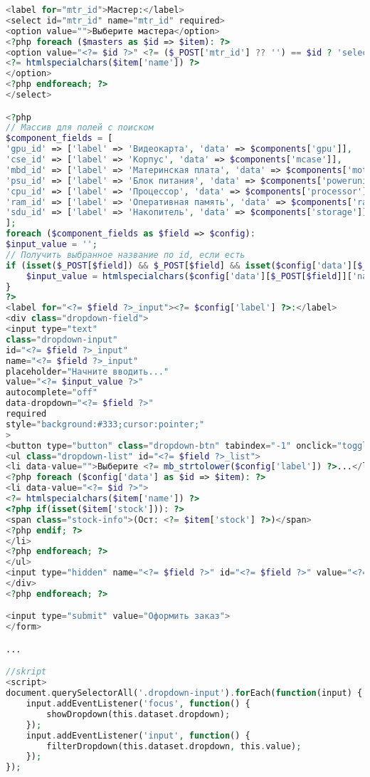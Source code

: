 \begin{lstlisting}[language=Php, frame=none]
<label for="mtr_id">Мастер:</label>
<select id="mtr_id" name="mtr_id" required>
<option value="">Выберите мастера</option>
<?php foreach ($masters as $id => $item): ?>
<option value="<?= $id ?>" <?= ($_POST['mtr_id'] ?? '') == $id ? 'selected' : '' ?>>
<?= htmlspecialchars($item['name']) ?>
</option>
<?php endforeach; ?>
</select>

<?php
// Массив для полей с поиском
$component_fields = [
'gpu_id' => ['label' => 'Видеокарта', 'data' => $components['gpu']],
'cse_id' => ['label' => 'Корпус', 'data' => $components['mcase']],
'mbd_id' => ['label' => 'Материнская плата', 'data' => $components['motherboard']],
'psu_id' => ['label' => 'Блок питания', 'data' => $components['powerunit']],
'cpu_id' => ['label' => 'Процессор', 'data' => $components['processor']],
'ram_id' => ['label' => 'Оперативная память', 'data' => $components['ram']],
'sdu_id' => ['label' => 'Накопитель', 'data' => $components['storage']]
];
foreach ($component_fields as $field => $config):
$input_value = '';
// Получить выбранное название по id, если есть
if (isset($_POST[$field]) && $_POST[$field] && isset($config['data'][$_POST[$field]])) {
	$input_value = htmlspecialchars($config['data'][$_POST[$field]]['name']);
}
?>
<label for="<?= $field ?>_input"><?= $config['label'] ?>:</label>
<div class="dropdown-field">
<input type="text"
class="dropdown-input"
id="<?= $field ?>_input"
name="<?= $field ?>_input"
placeholder="Начните вводить..."
value="<?= $input_value ?>"
autocomplete="off"
data-dropdown="<?= $field ?>"
required
style="background:#333;cursor:pointer;"
>
<button type="button" class="dropdown-btn" tabindex="-1" onclick="toggleDropdown('<?= $field ?>')">&#x25BC;</button>
<ul class="dropdown-list" id="<?= $field ?>_list">
<li data-value="">Выберите <?= mb_strtolower($config['label']) ?>...</li>
<?php foreach ($config['data'] as $id => $item): ?>
<li data-value="<?= $id ?>">
<?= htmlspecialchars($item['name']) ?>
<?php if(isset($item['stock'])): ?>
<span class="stock-info">(Ост: <?= $item['stock'] ?>)</span>
<?php endif; ?>
</li>
<?php endforeach; ?>
</ul>
<input type="hidden" name="<?= $field ?>" id="<?= $field ?>" value="<?= htmlspecialchars($_POST[$field] ?? '') ?>">
</div>
<?php endforeach; ?>

<input type="submit" value="Оформить заказ">
</form>

...

//skript
<script>
document.querySelectorAll('.dropdown-input').forEach(function(input) {
	input.addEventListener('focus', function() {
		showDropdown(this.dataset.dropdown);
	});
	input.addEventListener('input', function() {
		filterDropdown(this.dataset.dropdown, this.value);
	});
});


\end{lstlisting}
